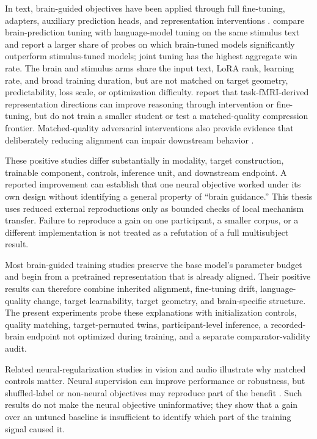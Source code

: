 In text, brain-guided objectives have been applied through full fine-tuning, adapters, auxiliary prediction heads, and representation interventions \autocite{negi2025,bilgin2026,merlinData2026,xiao2026}.
\textcite{merlinData2026} compare brain-prediction tuning with language-model tuning on the same stimulus text and report a larger share of probes on which brain-tuned models significantly outperform stimulus-tuned models; joint tuning has the highest aggregate win rate.
The brain and stimulus arms share the input text, LoRA rank, learning rate, and broad training duration, but are not matched on target geometry, predictability, loss scale, or optimization difficulty.
\textcite{xiao2026} report that task-fMRI-derived representation directions can improve reasoning through intervention or fine-tuning, but do not train a smaller student or test a matched-quality compression frontier.
Matched-quality adversarial interventions also provide evidence that deliberately reducing alignment can impair downstream behavior \autocite{merlin2026}.

These positive studies differ substantially in modality, target construction, trainable component, controls, inference unit, and downstream endpoint.
A reported improvement can establish that one neural objective worked under its own design without identifying a general property of ``brain guidance.''
This thesis uses reduced external reproductions only as bounded checks of local mechanism transfer.
Failure to reproduce a gain on one participant, a smaller corpus, or a different implementation is not treated as a refutation of a full multisubject result.

Most brain-guided training studies preserve the base model's parameter budget and begin from a pretrained representation that is already aligned.
Their positive results can therefore combine inherited alignment, fine-tuning drift, language-quality change, target learnability, target geometry, and brain-specific structure.
The present experiments probe these explanations with initialization controls, quality matching, target-permuted twins, participant-level inference, a recorded-brain endpoint not optimized during training, and a separate comparator-validity audit.

Related neural-regularization studies in vision and audio illustrate why matched controls matter.
Neural supervision can improve performance or robustness, but shuffled-label or non-neural objectives may reproduce part of the benefit \autocite{pirlot2022,freteault2025}.
Such results do not make the neural objective uninformative; they show that a gain over an untuned baseline is insufficient to identify which part of the training signal caused it.

